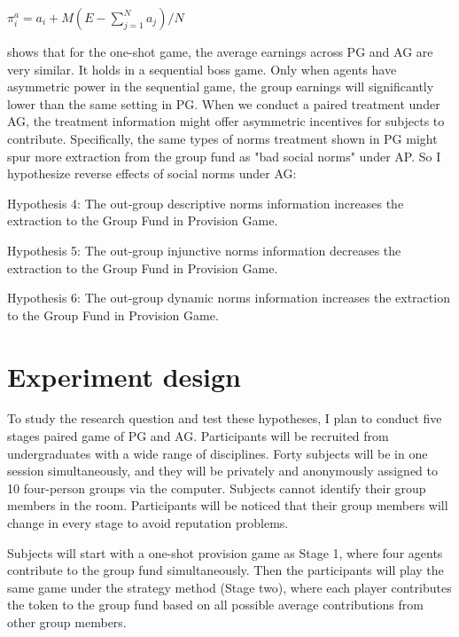 \documentclass[12pt]{article}
\begin{document}
\begin{center}
$
\pi_i^a=a_i+M(E-\sum_{j=1}^N a_j )/N
$
\end{center}

\cite{cox2013provision} shows that for the one-shot game, the average earnings across PG and AG are very similar. It holds in a sequential boss game. Only when agents have asymmetric power in the sequential game, the group earnings will significantly lower than the same setting in PG. 
When we conduct a paired treatment under AG, the treatment information might offer asymmetric incentives for subjects to contribute. Specifically, the same types of norms treatment shown in PG might spur more extraction from the group fund as "bad social norms" under AP. So I hypothesize reverse effects of social norms under AG: 

Hypothesis 4: 
The out-group descriptive norms information increases the extraction to the Group Fund in Provision Game.

Hypothesis 5:
The out-group injunctive norms information decreases the extraction to the Group Fund in Provision Game. 

Hypothesis 6:
The out-group dynamic norms information increases the extraction to the Group Fund in Provision Game.


\section{Experiment design }

To study the research question and test these hypotheses, I plan to conduct five stages paired game of PG and AG. Participants will be recruited from undergraduates with a wide range of disciplines. Forty subjects will be in one session simultaneously, and they will be privately and anonymously assigned to 10 four-person groups via the computer. Subjects cannot identify their group members in the room. Participants will be noticed that their group members will change in every stage to avoid reputation problems. 

Subjects will start with a one-shot provision game as Stage 1, where four agents contribute to the group fund simultaneously. Then the participants will play the same game under the strategy method (Stage two), where each player contributes the token to the group fund based on all possible average contributions from other group members. 
\end{document}
